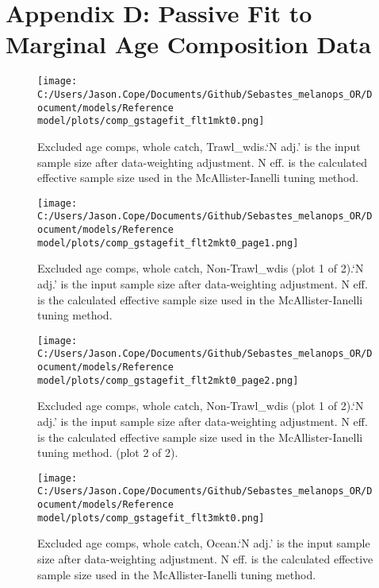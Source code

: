 \documentclass[11pt,
  english,
  letterpaper,
]{article}
\begin{document}
\clearpage

\hypertarget{app-d}{%
\section{Appendix D: Passive Fit to Marginal Age Composition Data}\label{app-d}}

\begin{figure}
\centering
\texttt{[image: C:/Users/Jason.Cope/Documents/Github/Sebastes\_melanops\_OR/Document/models/Reference model/plots/comp\_gstagefit\_flt1mkt0.png]}
\caption{Excluded age comps, whole catch, Trawl\_wdis.`N adj.' is the input sample size after data-weighting adjustment. N eff. is the calculated effective sample size used in the McAllister-Ianelli tuning method.\label{fig:comp_gstagefit_flt1mkt0}}
\end{figure}

\begin{figure}
\centering
\texttt{[image: C:/Users/Jason.Cope/Documents/Github/Sebastes\_melanops\_OR/Document/models/Reference model/plots/comp\_gstagefit\_flt2mkt0\_page1.png]}
\caption{Excluded age comps, whole catch, Non-Trawl\_wdis (plot 1 of 2).`N adj.' is the input sample size after data-weighting adjustment. N eff. is the calculated effective sample size used in the McAllister-Ianelli tuning method.\label{fig:comp_gstagefit_flt2mkt0_page1}}
\end{figure}

\begin{figure}
\centering
\texttt{[image: C:/Users/Jason.Cope/Documents/Github/Sebastes\_melanops\_OR/Document/models/Reference model/plots/comp\_gstagefit\_flt2mkt0\_page2.png]}
\caption{Excluded age comps, whole catch, Non-Trawl\_wdis (plot 1 of 2).`N adj.' is the input sample size after data-weighting adjustment. N eff. is the calculated effective sample size used in the McAllister-Ianelli tuning method. (plot 2 of 2).\label{fig:comp_gstagefit_flt2mkt0_page2}}
\end{figure}

\begin{figure}
\centering
\texttt{[image: C:/Users/Jason.Cope/Documents/Github/Sebastes\_melanops\_OR/Document/models/Reference model/plots/comp\_gstagefit\_flt3mkt0.png]}
\caption{Excluded age comps, whole catch, Ocean.`N adj.' is the input sample size after data-weighting adjustment. N eff. is the calculated effective sample size used in the McAllister-Ianelli tuning method.\label{fig:comp_gstagefit_flt3mkt0}}
\end{figure}
\end{document}
